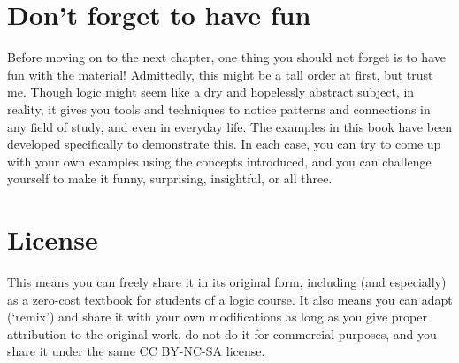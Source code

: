 \section*{Don't forget to have fun}

Before moving on to the next chapter, one thing you should not forget is to have fun with the material! Admittedly, this might be a tall order at first, but trust me. Though logic might seem like a dry and hopelessly abstract subject, in reality, it gives you tools and techniques to notice patterns and connections in any field of study, and even in everyday life. The examples in this book have been developed specifically to demonstrate this. In each case, you can try to come up with your own examples using the concepts introduced, and you can challenge yourself to make it funny, surprising, insightful, or all three. 

\section*{License}

\doclicenseThis

\noindent This means you can freely share it in its original form, including (and especially) as a zero-cost textbook for students of a logic course. It also means you can adapt (`remix')  and share it with your own modifications as long as you give proper attribution to the original work, do not do it for commercial purposes, and you share it under the same \textsf{CC BY-NC-SA} license. 